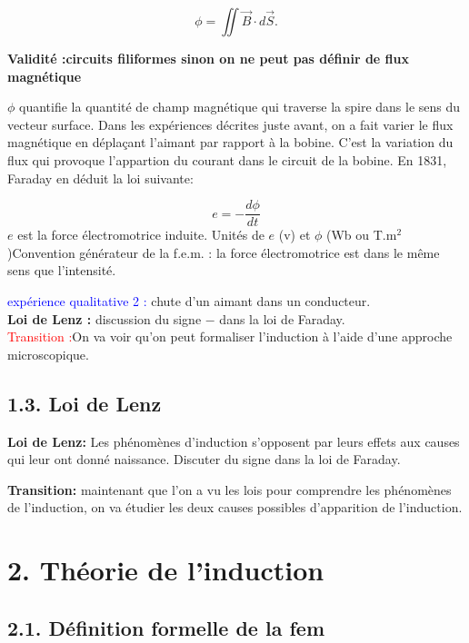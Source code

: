 \documentclass[french, a4paper, 10pt, twocolumn, landscape]{article}
\begin{document}
\begin{equation}
    \phi =\iint \vec{B}\cdot d\vec{S}.
\end{equation}

\textbf{Validité :circuits filiformes sinon on ne peut pas définir de flux magnétique}

$\phi$ quantifie la quantité de champ magnétique qui traverse la spire dans le sens du vecteur surface. 
Dans les expériences décrites juste avant, on a fait varier le flux magnétique en déplaçant l'aimant par rapport à la bobine. C'est la variation du flux qui provoque l'appartion du courant dans le circuit de la bobine. En 1831, Faraday en déduit la loi suivante:

\begin{equation}
    e = - \dfrac{d\phi}{dt}
\end{equation}
$e$ est la force électromotrice induite. Unités de $e$ (v) et $\phi$ (Wb ou T.m$^2$)Convention générateur de la f.e.m. : la force électromotrice est dans le même sens que l'intensité.\medskip

\textcolor{blue}{expérience qualitative 2 :} chute d'un aimant dans un conducteur.\\
\textbf{Loi de Lenz :} discussion du signe $-$ dans la loi de Faraday.\\

\textcolor{red}{Transition :}On va voir qu'on peut formaliser l'induction à l'aide d'une approche microscopique. 

\subsection*{1.3. Loi de Lenz}

\textbf{Loi de Lenz:} Les phénomènes d'induction s'opposent par leurs effets aux causes qui leur ont donné naissance. Discuter du signe dans la loi de Faraday. \medskip

\textbf{Transition:} maintenant que l'on a vu les lois pour comprendre les phénomènes de l'induction, on va étudier  les deux causes possibles d'apparition de l'induction.

\section*{2. Théorie de l'induction}

\subsection*{2.1. Définition formelle de la fem}
\end{document}
